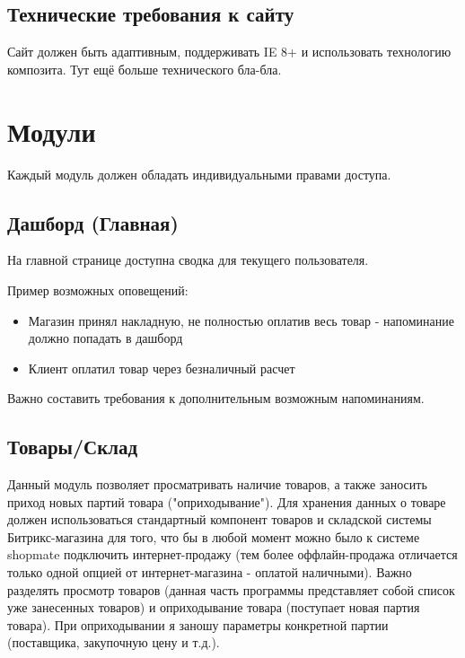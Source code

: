 \documentclass[DIV=calc, paper=a4, fontsize=11pt]{scrartcl} %
\begin{document}
\subsection{Технические требования к сайту}
Сайт должен быть адаптивным, поддерживать IE 8+ и использовать технологию композита.
Тут ещё больше технического бла-бла.


\section{Модули}

Каждый модуль должен обладать индивидуальными правами доступа.

\subsection{Дашборд (Главная)}
На главной странице доступна сводка для текущего пользователя. 

Пример возможных оповещений:

\begin{itemize}
	\item Магазин принял накладную, не полностью оплатив весь товар - напоминание должно попадать в дашборд
	\item Клиент оплатил товар через безналичный расчет 
\end{itemize}

Важно составить требования к дополнительным возможным напоминаниям.

\subsection{Товары/Склад}

Данный модуль позволяет просматривать наличие товаров, а также заносить приход новых партий товара ("оприходывание"). Для хранения данных о товаре должен использоваться стандартный компонент товаров и складской системы Битрикс-магазина для того, что бы в любой момент можно было к системе shopmate подключить интернет-продажу (тем более оффлайн-продажа отличается только одной опцией от интернет-магазина - оплатой наличными). Важно разделять просмотр товаров (данная часть программы представляет собой список уже занесенных товаров) и оприходывание товара (поступает новая партия товара). При оприходывании я заношу параметры конкретной партии (поставщика, закупочную цену и т.д.).
\end{document}
